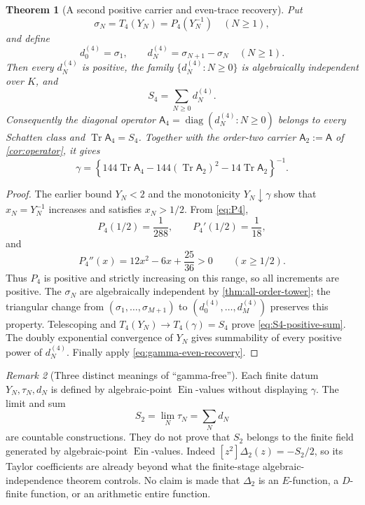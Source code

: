 \documentclass[11pt]{article}
\theoremstyle{keio}
\newtheorem{theorem}{Theorem}[section]
\theoremstyle{definition}
\theoremstyle{remark}
\newtheorem{remark}[theorem]{Remark}
\newcommand{\Ein}{\operatorname{Ein}}
\newcommand{\Tr}{\operatorname{Tr}}
\newcommand{\diag}{\operatorname{diag}}
\begin{document}
\begin{theorem}[A second positive carrier and even-trace recovery]
\label{thm:positive-S4-carrier}
Put
\[
 \sigma_N=T_4(Y_N)=P_4(Y_N^{-1})\quad(N\ge1),
\]
and define
\[
 d_0^{(4)}=\sigma_1,\qquad
 d_N^{(4)}=\sigma_{N+1}-\sigma_N\quad(N\ge1).
\]
Then every \(d_N^{(4)}\) is positive, the family
\(\{d_N^{(4)}:N\ge0\}\) is algebraically independent over \(K\), and
\begin{equation}\label{eq:S4-positive-sum}
 S_4=\sum_{N\ge0}d_N^{(4)}.
\end{equation}
Consequently the diagonal operator
\(\mathsf A_4=\diag(d_N^{(4)}:N\ge0)\) belongs to every Schatten class and
\(\Tr\mathsf A_4=S_4\).  Together with the order-two carrier
\(\mathsf A_2:=\mathsf A\) of \cref{cor:operator}, it gives
\begin{equation}\label{eq:gamma-two-positive-carriers}
 \boxed{\displaystyle
 \gamma=
 \left\{144\Tr\mathsf A_4
 -144(\Tr\mathsf A_2)^2-14\Tr\mathsf A_2\right\}^{-1}.}
\end{equation}
\end{theorem}

\begin{proof}
The earlier bound \(Y_N<2\) and the monotonicity \(Y_N\downarrow\gamma\)
show that \(x_N=Y_N^{-1}\) increases and satisfies \(x_N>1/2\).  From
\eqref{eq:P4},
\[
 P_4(1/2)=\frac1{288},\qquad P_4'(1/2)=\frac1{18},
\]
and
\[
 P_4''(x)=12x^2-6x+\frac{25}{36}>0\qquad(x\ge1/2).
\]
Thus \(P_4\) is positive and strictly increasing on this range, so all
increments are positive.  The \(\sigma_N\) are algebraically
independent by \cref{thm:all-order-tower}; the triangular change from
\((\sigma_1,\ldots,\sigma_{M+1})\) to
\((d_0^{(4)},\ldots,d_M^{(4)})\) preserves this property.  Telescoping and
\(T_4(Y_N)\to T_4(\gamma)=S_4\) prove
\eqref{eq:S4-positive-sum}.  The doubly exponential convergence of \(Y_N\)
gives summability of every positive power of \(d_N^{(4)}\).  Finally apply
\eqref{eq:gamma-even-recovery}.
\end{proof}

\begin{remark}[Three distinct meanings of ``gamma-free'']
Each finite datum \(Y_N,\tau_N,d_N\) is defined by algebraic-point
\(\Ein\)-values without displaying \(\gamma\).  The limit and sum
\[
 S_2=\lim_N\tau_N=\sum_Nd_N
\]
are countable constructions.  They do not prove that \(S_2\) belongs to the
finite field generated by algebraic-point \(\Ein\)-values.  Indeed
\([z^2]\Delta_2(z)=-S_2/2\), so its Taylor coefficients are already beyond
what the finite-stage algebraic-independence theorem controls.  No claim is
made that \(\Delta_2\) is an \(E\)-function, a \(D\)-finite function, or an
arithmetic entire function.
\end{remark}
\end{document}
